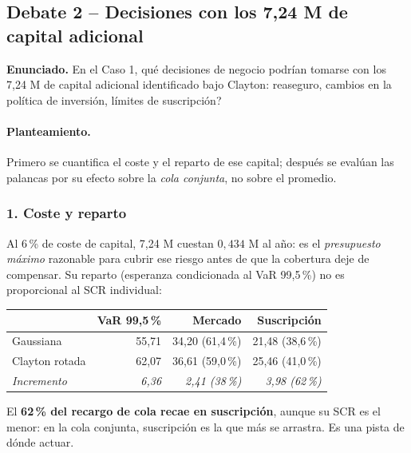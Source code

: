 \documentclass[a4paper,12pt]{article}
\newcommand{\euro}{\texteuro}
\begin{document}
\subsection{Debate 2 -- Decisiones con los 7,24 M\euro{} de capital adicional}

\noindent\textbf{Enunciado.} En el Caso 1, \textquestiondown{}qué decisiones de negocio podrían tomarse con los 7,24 M\euro{} de capital adicional identificado bajo Clayton: reaseguro, cambios en la política de inversión, límites de suscripción?

\paragraph{Planteamiento.} Primero se cuantifica el coste y el reparto de ese capital; después se evalúan las palancas por su efecto sobre la \emph{cola conjunta}, no sobre el promedio.

\subsubsection*{1. Coste y reparto}
Al 6\,\% de coste de capital, 7,24 M\euro{} cuestan $0{,}434$ M\euro{} al año: es el \emph{presupuesto máximo} razonable para cubrir ese riesgo antes de que la cobertura deje de compensar. Su reparto (esperanza condicionada al VaR 99,5\,\%) no es proporcional al SCR individual:
\begin{center}
\small
\begin{tabular}{lrrr}
\toprule
 & VaR 99,5\,\% & Mercado & Suscripción\\
\midrule
Gaussiana & 55,71 & 34,20 (61,4\,\%) & 21,48 (38,6\,\%)\\
Clayton rotada & 62,07 & 36,61 (59,0\,\%) & 25,46 (41,0\,\%)\\
\emph{Incremento} & \emph{6,36} & \emph{2,41 (38\,\%)} & \emph{3,98 (62\,\%)}\\
\bottomrule
\end{tabular}
\end{center}
El \textbf{62\,\% del recargo de cola recae en suscripción}, aunque su SCR es el menor: en la cola conjunta, suscripción es la que más se arrastra. Es una pista de dónde actuar.
\end{document}
